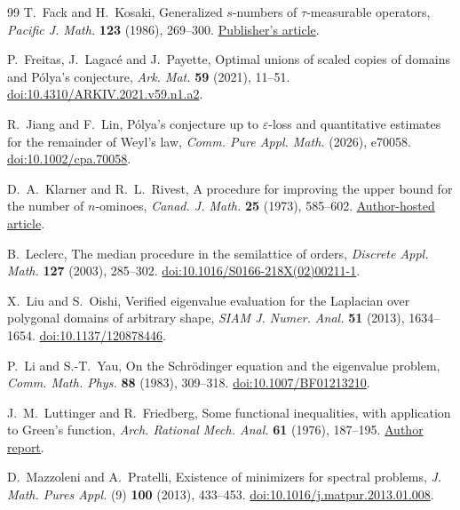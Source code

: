 \documentclass[11pt,reqno]{amsart}
\numberwithin{equation}{section}
\begin{document}
\begin{thebibliography}{99}
T.~Fack and H.~Kosaki,
Generalized \(s\)-numbers of \(\tau\)-measurable operators,
\emph{Pacific J. Math.} \textbf{123} (1986), 269--300.
\href{https://msp.org/pjm/1986/123-2/pjm-v123-n2-p03-s.pdf}
{Publisher's article}.

P.~Freitas, J.~Lagac\'e and J.~Payette,
Optimal unions of scaled copies of domains and P\'olya's conjecture,
\emph{Ark. Mat.} \textbf{59} (2021), 11--51.
\href{https://doi.org/10.4310/ARKIV.2021.v59.n1.a2}{doi:10.4310/ARKIV.2021.v59.n1.a2}.

R.~Jiang and F.~Lin,
P\'olya's conjecture up to $\varepsilon$-loss and quantitative estimates
for the remainder of Weyl's law,
\emph{Comm. Pure Appl. Math.} (2026), e70058.
\href{https://doi.org/10.1002/cpa.70058}{doi:10.1002/cpa.70058}.

D.~A.~Klarner and R.~L.~Rivest,
A procedure for improving the upper bound for the number of $n$-ominoes,
\emph{Canad. J. Math.} \textbf{25} (1973), 585--602.
\href{https://people.csail.mit.edu/rivest/pubs/KR73.pdf}{Author-hosted article}.

B.~Leclerc,
The median procedure in the semilattice of orders,
\emph{Discrete Appl. Math.} \textbf{127} (2003), 285--302.
\href{https://doi.org/10.1016/S0166-218X(02)00211-1}
{doi:10.1016/S0166-218X(02)00211-1}.

X.~Liu and S.~Oishi,
Verified eigenvalue evaluation for the Laplacian over polygonal domains
of arbitrary shape,
\emph{SIAM J. Numer. Anal.} \textbf{51} (2013), 1634--1654.
\href{https://doi.org/10.1137/120878446}{doi:10.1137/120878446}.

P.~Li and S.-T.~Yau,
On the Schr\"odinger equation and the eigenvalue problem,
\emph{Comm. Math. Phys.} \textbf{88} (1983), 309--318.
\href{https://doi.org/10.1007/BF01213210}{doi:10.1007/BF01213210}.

J.~M.~Luttinger and R.~Friedberg,
Some functional inequalities, with application to Green's function,
\emph{Arch. Rational Mech. Anal.} \textbf{61} (1976), 187--195.
\href{https://www.osti.gov/servlets/purl/4482963}
{Author report}.

D.~Mazzoleni and A.~Pratelli,
Existence of minimizers for spectral problems,
\emph{J. Math. Pures Appl.} (9) \textbf{100} (2013), 433--453.
\href{https://doi.org/10.1016/j.matpur.2013.01.008}{doi:10.1016/j.matpur.2013.01.008}.


\end{thebibliography}
\end{document}
